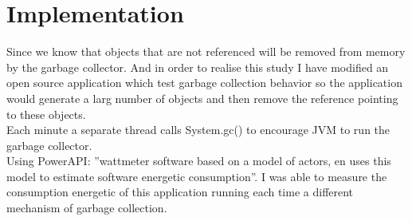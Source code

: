 \section{Implementation}
\label{sec:Implementation}
Since we know that objects that are not referenced will be removed from memory by the garbage collector.
And in order to realise this study I have modified an open source application\cite{GCTest} which test garbage collection behavior so the application would generate a larg number of objects and then remove the reference pointing to these objects.\\
Each minute a separate thread calls System.gc() to encourage JVM to run the garbage collector.\\
Using PowerAPI\cite{powerAPI}: ''wattmeter software based on a model of actors, en uses this model to estimate software energetic consumption''.\cite{powerAPIFR}
I was able to measure the consumption energetic of this application running each time a different mechanism of garbage collection.
 